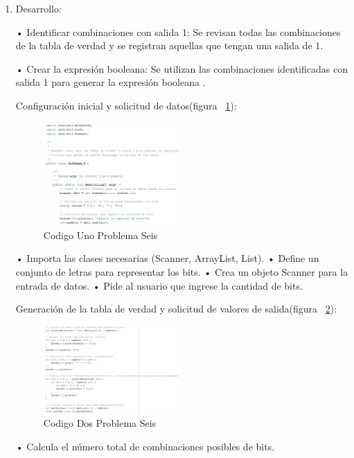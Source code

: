 \documentclass{IEEEcsmag}
\begin{document}
\begin{enumerate}
\item Desarrollo:

•	Identificar combinaciones con salida 1: Se revisan todas las combinaciones de la tabla de verdad y se registran aquellas que tengan una salida de 1.

•	Crear la expresión booleana: Se utilizan las combinaciones identificadas con salida 1 para generar la expresión booleana .

Configuración inicial y solicitud de datos(figura ~\ref{fig:codigo1P6}):

\begin{figure}
\caption{Codigo Uno Problema Seis}
\centerline{\includegraphics[width=0.5\textwidth]{./latex-imagenes/codigo1prob6.jpg}}
\vspace*{7pt}
\label{fig:codigo1P6}
\end{figure} 


•	Importa las clases necesarias (Scanner, ArrayList, List).
•	Define un conjunto de letras para representar los bits.
•	Crea un objeto Scanner para la entrada de datos.
•	Pide al usuario que ingrese la cantidad de bits.

Generación de la tabla de verdad y solicitud de valores de salida(figura ~\ref{fig:codigo2P6}):
\begin{figure}
\caption{Codigo Dos Problema Seis}
\centerline{\includegraphics[width=0.5\textwidth]{./latex-imagenes/codigo2prob6.jpg}}
\vspace*{7pt}
\label{fig:codigo2P6}
\end{figure}


•	Calcula el número total de combinaciones posibles de bits.


\end{enumerate}
\end{document}
